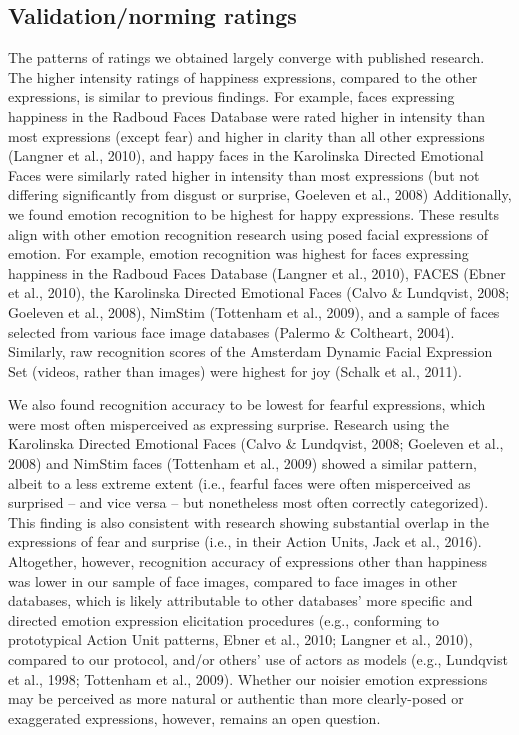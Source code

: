 \documentclass[
  letterpaper,
  DIV=11,
  numbers=noendperiod]{scrartcl}
\newcounter{none} %
\begin{document}
\subsection{Validation/norming ratings}\label{validationnorming-ratings}

The patterns of ratings we obtained largely converge with published
research. The higher intensity ratings of happiness expressions,
compared to the other expressions, is similar to previous findings. For
example, faces expressing happiness in the Radboud Faces Database were
rated higher in intensity than most expressions (except fear) and higher
in clarity than all other expressions (Langner et al., 2010), and happy
faces in the Karolinska Directed Emotional Faces were similarly rated
higher in intensity than most expressions (but not differing
significantly from disgust or surprise, Goeleven et al., 2008)
Additionally, we found emotion recognition to be highest for happy
expressions. These results align with other emotion recognition research
using posed facial expressions of emotion. For example, emotion
recognition was highest for faces expressing happiness in the Radboud
Faces Database (Langner et al., 2010), FACES (Ebner et al., 2010), the
Karolinska Directed Emotional Faces (Calvo \& Lundqvist, 2008; Goeleven
et al., 2008), NimStim (Tottenham et al., 2009), and a sample of faces
selected from various face image databases (Palermo \& Coltheart, 2004).
Similarly, raw recognition scores of the Amsterdam Dynamic Facial
Expression Set (videos, rather than images) were highest for joy (Schalk
et al., 2011).

We also found recognition accuracy to be lowest for fearful expressions,
which were most often misperceived as expressing surprise. Research
using the Karolinska Directed Emotional Faces (Calvo \& Lundqvist, 2008;
Goeleven et al., 2008) and NimStim faces (Tottenham et al., 2009) showed
a similar pattern, albeit to a less extreme extent (i.e., fearful faces
were often misperceived as surprised -- and vice versa -- but
nonetheless most often correctly categorized). This finding is also
consistent with research showing substantial overlap in the expressions
of fear and surprise (i.e., in their Action Units, Jack et al., 2016).
Altogether, however, recognition accuracy of expressions other than
happiness was lower in our sample of face images, compared to face
images in other databases, which is likely attributable to other
databases' more specific and directed emotion expression elicitation
procedures (e.g., conforming to prototypical Action Unit patterns, Ebner
et al., 2010; Langner et al., 2010), compared to our protocol, and/or
others' use of actors as models (e.g., Lundqvist et al., 1998; Tottenham
et al., 2009). Whether our noisier emotion expressions may be perceived
as more natural or authentic than more clearly-posed or exaggerated
expressions, however, remains an open question.
\end{document}
